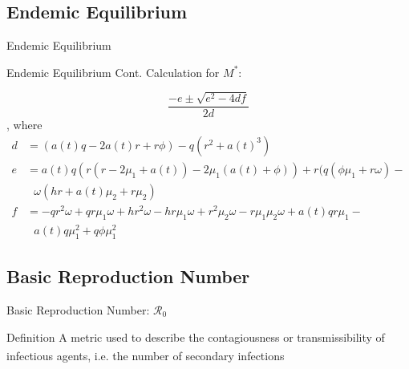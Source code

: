 \documentclass{beamer}
\begin{document}
\subsection{Endemic Equilibrium}
\begin{frame}{Endemic Equilibrium}
\end{frame}


\begin{frame}{Endemic Equilibrium Cont.}
Calculation for $M^{*}$:

$$\frac{-e \pm \sqrt{e^2 - 4df}}{2d}$$, where
\begin{align*}
    d &= (a(t)q-2a(t)r+r \phi ) - q(r^{2}+a(t)^{3})\\
    e &= a(t)q(r(r-2\mu_{1}+a(t))-2\mu_{1}(a(t)+\phi )) +  r(q(\phi \mu_{1} + r \omega ) - \\ & \ \ \  \omega(hr+a(t) \mu_{2} + r\mu_{2})\\
    f &= -qr^{2} \omega +qr\mu_{1} \omega + hr^{2} \omega - hr\mu_{1} \omega + r^2 \mu_{2} \omega - r \mu_{1} \mu_{2} \omega + a(t)qr \mu_{1} - \\ & \ \ \  a(t)q\mu_{1}^{2} +q\phi \mu_{1}^{2}
\end{align*}

\end{frame}

\subsection{Basic Reproduction Number}
\begin{frame}{Basic Reproduction Number: $\mathscr{R}_{0}$}
    \begin{block}{Definition}
        A metric used to describe the contagiousness or transmissibility of infectious agents\textsuperscript{\cite{delamater_street_leslie_yang_jacobsen_2019}}, i.e. the number of secondary infections
    \end{block}
\end{frame}
\end{document}
